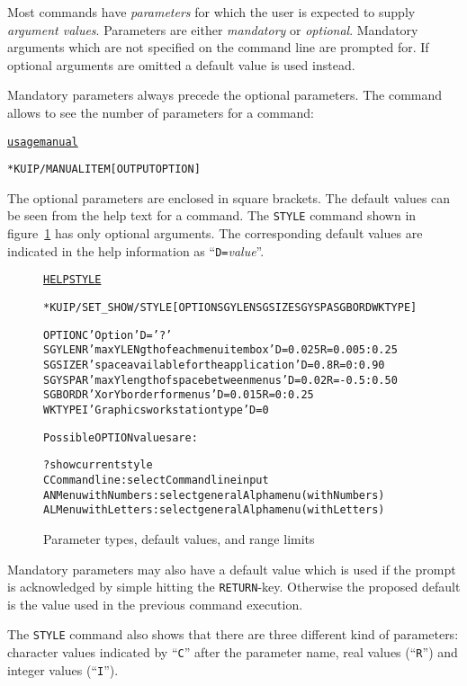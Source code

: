 Most commands have \emph{parameters} for which the user is expected to
supply \emph{argument values}.
Parameters are either \emph{mandatory} or \emph{optional}.
Mandatory arguments which are not specified on the command line are
prompted for.
If optional arguments are omitted a default value is used instead.

Mandatory parameters always precede the optional parameters.
The command  allows to see the number of parameters for a command:
\begin{alltt}
\PROMPT{} \underline{usage manual}

 * KUIP/MANUAL ITEM [ OUTPUT OPTION ]
\end{alltt}
The optional parameters are enclosed in square brackets.
The default values can be seen from the help text for a command.
The \texttt{STYLE} command shown in figure~\ref{fig-help-style} 
has only optional arguments.
The corresponding default values are indicated in the help information
as ``\texttt{D=}\textsl{value}''.

\begin{figure}
\begin{alltt}
\PROMPT{} \underline{HELP STYLE}

 * KUIP/SET_SHOW/STYLE [ OPTION SGYLEN SGSIZE SGYSPA SGBORD WKTYPE ]

   OPTION     C 'Option' D='?'
   SGYLEN     R 'max Y LENgth of each menu item box' D=0.025 R=0.005:0.25
   SGSIZE     R 'space available for the application' D=0.8 R=0:0.90
   SGYSPA     R 'max Y length of space between menus' D=0.02 R=-0.5:0.50
   SGBORD     R 'X or Y border for menus' D=0.015 R=0:0.25
   WKTYPE     I 'Graphics workstation type' D=0

   Possible OPTION values are:

    ?   show current style
    C   Command line : select Command line input
    AN  Menu with Numbers : select general Alpha menu (with Numbers)
    AL  Menu with Letters : select general Alpha menu (with Letters)
\end{alltt}
\caption{Parameter types, default values, and range limits
\label{fig-help-style}}
\end{figure}

Mandatory parameters may also have a default value which is used if
the prompt is acknowledged by simple hitting the \texttt{RETURN}-key.
Otherwise the proposed default is the value used in the previous
command execution.

The \texttt{STYLE} command also shows that there are three different
kind of parameters:
character values indicated by ``\texttt{C}'' after the parameter
name, real values (``\texttt{R}'') and integer values
(``\texttt{I}'').

